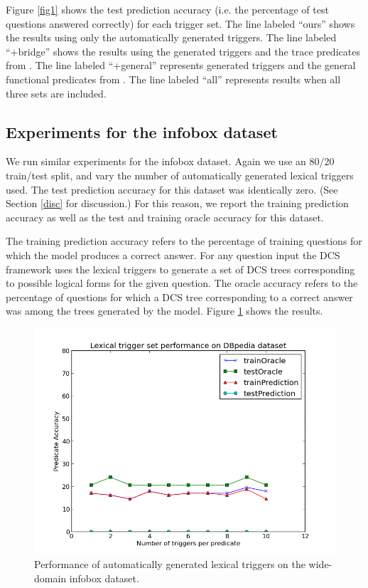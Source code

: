 \documentclass[11pt]{article}
\begin{document}
Figure \ref{fig1} shows the test prediction accuracy (i.e. the percentage of
test questions answered correctly) for each trigger set.  
The line labeled ``ours'' shows the results using only the
automatically generated triggers. The line labeled ``+bridge'' shows the
results using the generated triggers and the trace predicates from
\cite{LJK11}. The line labeled ``+general'' represents generated triggers and
the general functional predicates from \cite{LJK11}. The line labeled ``all''
represents results when all three sets are included.


\subsection{Experiments for the {\sc infobox} dataset}

We run similar experiments for the {\sc infobox} dataset. Again we use an 80/20
train/test split, and vary the number of automatically generated lexical
triggers used. The test prediction accuracy for this dataset was identically
zero. (See Section \ref{disc} for discussion.) For this reason, we report the
training prediction accuracy as well as the test and training oracle accuracy
for this dataset. 

The training prediction accuracy refers to the percentage of
training questions for which the model produces a correct answer. For any
question input the DCS framework uses the lexical triggers to generate a set of
DCS trees corresponding to possible logical forms for the given question. 
The oracle accuracy refers to the percentage of questions for which a DCS
tree corresponding to a correct answer was among the trees generated by the model.  
Figure \ref{fig2} shows the results. 

\begin{figure}[!htb]\label{fig2}
\begin{center}
  \includegraphics[scale=0.40]{figs/ibPerf.png}
\caption{Performance of automatically generated lexical triggers on the
wide-domain {\sc infobox} dataset.}
\end{center}
\end{figure}
\end{document}
